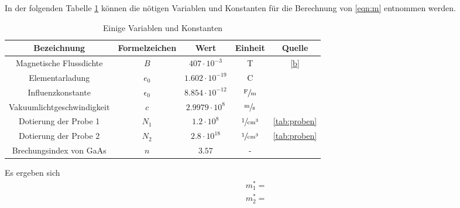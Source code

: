 In der folgenden Tabelle \ref{tab:var} können die nötigen Variablen und Konstanten für die Berechnung von \eqref{eqn:m} entnommen werden.
\begin{table}[H]
  \centering
  \begin{tabular}{ccccc}
    \toprule
    Bezeichnung & Formelzeichen & Wert & Einheit & Quelle \\
    \midrule
    Magnetische Flussdichte    & $B$          & $407\cdot10^{-3}$    & T                           & \eqref{b} \\
    Elementarladung            & $e_0$        & $1.602\cdot10^{-19}$ & C                           & \cite{pdg} \\
    Influenzkonstante          & $\epsilon_0$ & $8.854\cdot10^{-12}$ & $\sfrac{\text{F}}{\text{m}}$ & \cite{pdg} \\
    Vakuumlichtgeschwindigkeit & $c$          & $2.9979\cdot10^{8}$  & $\sfrac{\text{m}}{\text{s}}$               & \cite{pdg} \\
    Dotierung der Probe 1      & $N_1$        & $1.2\cdot10^{8}$     & $\sfrac{1}{\text{cm}^3}$     & \ref{tab:proben} \\
    Dotierung der Probe 2      & $N_2$        & $2.8\cdot10^{18}$    & $\sfrac{1}{\text{cm}^3}$     & \ref{tab:proben} \\
    Brechungsindex von GaAs    & $n$          & $3.57$               & -                           & \cite{cb} \\
    \bottomrule
  \end{tabular}
  \caption{Einige Variablen und Konstanten}
  \label{tab:var}
\end{table}

Es ergeben sich
\begin{gather*}
  m_1^* = \\
  m_2^* = 
\end{gather*}
